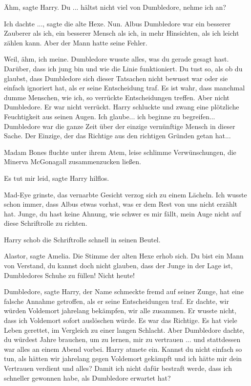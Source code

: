 \glqq{}Ähm\grqq{}, sagte Harry. \glqq{}Du ... hältst nicht viel von Dumbledore,
nehme ich an?\grqq{}

\glqq{}Ich dachte ...\grqq{}, sagte die alte Hexe. \glqq{}Nun. Albus Dumbledore
war ein besserer Zauberer als ich, ein besserer Mensch als ich, in mehr
Hinsichten, als ich leicht zählen kann. Aber der Mann hatte seine Fehler.\grqq{}

\glqq{}Weil, ähm, ich meine. Dumbledore wusste alles, was du gerade gesagt hast.
Darüber, dass ich jung bin und wie die Linie funktioniert. Du tust so, als ob du
glaubst, dass Dumbledore sich dieser Tatsachen nicht bewusst war oder sie
einfach ignoriert hat, als er seine Entscheidung traf. Es ist wahr, dass
manchmal dumme Menschen, wie ich, so verrückte Entscheidungen treffen. Aber
nicht Dumbledore. Er war nicht verrückt.\grqq{} Harry schluckte und zwang eine
plötzliche Feuchtigkeit aus seinen Augen. \glqq{}Ich glaube... ich beginne zu
begreifen... Dumbledore war die ganze Zeit über der einzige vernünftige Mensch
in dieser Sache. Der Einzige, der das Richtige aus den richtigen Gründen getan
hat...\grqq{}

Madam Bones fluchte unter ihrem Atem, leise schlimme Verwünschungen, die Minerva
McGonagall zusammenzucken ließen.

\glqq{}Es tut mir leid\grqq{}, sagte Harry hilflos.

Mad-Eye grinste, das vernarbte Gesicht verzog sich zu einem Lächeln. \glqq{}Ich
wusste schon immer, dass Albus etwas vorhat, was er dem Rest von uns nicht
erzählt hat. Junge, du hast keine Ahnung, wie schwer es mir fällt, mein Auge
nicht auf diese Schriftrolle zu richten.\grqq{}

Harry schob die Schriftrolle schnell in seinen Beutel.

\glqq{}Alastor\grqq{}, sagte Amelia. Die Stimme der alten Hexe erhob sich. \glqq{}
Du bist ein Mann von Verstand, du kannst doch nicht glauben, dass der Junge in
der Lage ist, Dumbledores Schuhe zu füllen! Nicht heute!\grqq{}

\glqq{}Dumbledore\grqq{}, sagte Harry, der Name schmeckte fremd auf seiner Zunge,
\glqq{}hat eine falsche Annahme getroffen, als er seine Entscheidungen traf. Er
dachte, wir würden Voldemort jahrelang bekämpfen, wir alle zusammen. Er wusste
nicht, dass ich Voldemort sofort auslöschen würde. Es war das Richtige. Es hat
viele Leben gerettet, im Vergleich zu einer langen Schlacht. Aber Dumbledore
dachte, du würdest Jahre brauchen, um zu lernen, mir zu vertrauen ... und
stattdessen war alles an einem Abend vorbei.\grqq{} Harry atmete ein. \glqq{}Kannst du
nicht einfach so tun, als hätten wir jahrelang gegen Voldemort gekämpft und ich
hätte mir dein Vertrauen verdient und alles? Damit ich nicht dafür bestraft
werde, dass ich schneller gewonnen habe, als Dumbledore erwartet hat?\grqq{}

